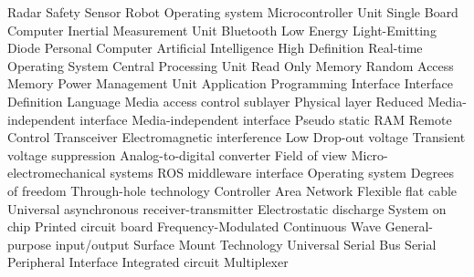 {Radar Safety Sensor}    
        {Robot Operating system} 
        {Microcontroller Unit}
        {Single Board Computer}
        {Inertial Measurement Unit}
        {Bluetooth Low Energy}
        {Light-Emitting Diode}
        {Personal Computer}
        {Artificial Intelligence}
		{High Definition}
		{Real-time Operating System}
		{Central Processing Unit}
		{Read Only Memory}
		{Random Access Memory}
		{Power Management Unit}
		{Application Programming Interface}
		{Interface Definition Language}
		{Media access control sublayer}
		{Physical layer}
		{Reduced Media-independent interface}
		{Media-independent interface}
            {Pseudo static RAM}
            {Remote Control Transceiver}
            {Electromagnetic interference}
            {Low Drop-out voltage}
            {Transient voltage suppression}
            {Analog-to-digital converter}
            {Field of view}
            {Micro-electromechanical systems}
            {ROS middleware interface }
            {Operating system}
            {Degrees of freedom}
            {Through-hole technology}
            {Controller Area Network}
            {Flexible flat cable}
            {Universal asynchronous receiver-transmitter}
            {Electrostatic discharge}
            {System on chip}
            {Printed circuit board}
            {Frequency-Modulated Continuous Wave}
            {General-purpose input/output}
            {Surface Mount Technology}
            {Universal Serial Bus}
            {Serial Peripheral Interface}
            {Integrated circuit}
            {Multiplexer}      
